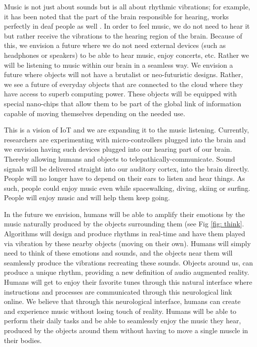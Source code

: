 \documentclass[sigchi]{acmart}
\begin{document}
Music is not just about sounds but is all about rhythmic vibrations; for example, it has been noted that the part of the brain responsible for hearing, works perfectly in deaf people as well \cite{abcsciencemusic}. In order to feel music, we do not need to hear it but rather receive the vibrations to the hearing region of the brain. Because of this, we envision a future where we do not need external devices (such as headphones or speakers) to be able to hear music, enjoy concerts, etc. Rather we will be listening to music within our brain in a seamless way. We envision a future where objects will not have a brutalist or neo-futuristic designs. Rather, we see a future of everyday objects that are connected to the cloud \cite{musk2019integrated} where they have access to superb computing power. These objects will be equipped with special nano-chips that allow them to be part of the global link of information capable of moving themselves depending on the needed use.

This is a vision of IoT \cite{weisman2004internet} and we are expanding it to the music listening. Currently, researchers are experimenting with micro-controllers plugged into the brain and we envision having such devices plugged into our hearing part of our brain. Thereby allowing humans and objects to telepathically-communicate. Sound signals will be delivered straight into our auditory cortex, into the brain directly. People will no longer have to depend on their ears to listen and hear things. As such, people could enjoy music even while spacewalking, diving, skiing or surfing. People will enjoy music and will help them keep going. 

In the future we envision, humans will be able to amplify their emotions by the music naturally produced by the objects surrounding them (see Fig \ref{fig: think}. Algorithms will design and produce rhythms in real-time and have them played via vibration by these nearby objects (moving on their own). Humans will simply need to think of these emotions and sounds, and the objects near them will seamlessly produce the vibrations recreating these sounds. Objects around us, can produce a unique rhythm, providing a new definition of audio augmented reality. Humans will get to enjoy their favorite tunes through this natural interface where instructions and processes are communicated through this neurological link online. We believe that through this neurological interface, humans can create and experience music without losing touch of reality. Humans will be able to perform their daily tasks and be able to seamlessly enjoy the music they hear, produced by the objects around them without having to move a single muscle in their bodies. 
\end{document}
